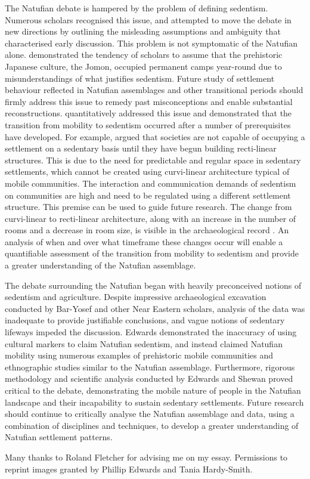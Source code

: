 \documentclass[%
	]{ijsra}
\begin{document}
The Natufian debate is hampered by the problem of defining sedentism. Numerous scholars recognised this issue, and attempted to move the debate in new directions by outlining the misleading assumptions and ambiguity that characterised early discussion. This problem is not symptomatic of the Natufian alone. 
\textcite{Habu_1996} demonstrated the tendency of scholars to assume that the prehistoric Japanese culture, the Jomon, occupied permanent camps year-round due to misunderstandings of what justifies sedentism. Future study of settlement behaviour reflected in Natufian assemblages and other transitional periods should firmly address this issue to remedy past misconceptions and enable substantial reconstructions. 
\textcite{Fletcher_2007} quantitatively addressed this issue and demonstrated that the transition from mobility to sedentism occurred after a number of prerequisites have developed. 
For example, \textcite{Fletcher_2007} argued that societies are not capable of occupying a settlement on a sedentary basis until they have begun building recti-linear structures. This is due to the need for predictable and regular space in sedentary settlements, which cannot be created using curvi-linear architecture typical of mobile communities. The interaction and communication demands of sedentism on communities are high and need to be regulated using a different settlement structure. This premise can be used to guide future research. 
The change from curvi-linear to recti-linear architecture, along with an increase in the number of rooms and a decrease in room size, is visible in the archaeological record \parencite{Byrd_2005}. An analysis of when and over what timeframe these changes occur will enable a quantifiable assessment of the transition from mobility to sedentism and provide a greater understanding of the Natufian assemblage.

The debate surrounding the Natufian began with heavily preconceived notions of sedentism and agriculture. Despite impressive archaeological excavation conducted by Bar-Yosef and other Near Eastern scholars, analysis of the data was inadequate to provide justifiable conclusions, and vague notions of sedentary lifeways impeded the discussion. Edwards demonstrated the inaccuracy of using cultural markers to claim Natufian sedentism, and instead claimed Natufian mobility using numerous examples of prehistoric mobile communities and ethnographic studies similar to the Natufian assemblage. Furthermore, rigorous methodology and scientific analysis conducted by Edwards and Shewan proved critical to the debate, demonstrating the mobile nature of people in the Natufian landscape and their incapability to sustain sedentary settlements. Future research should continue to critically analyse the Natufian assemblage and data, using a combination of disciplines and techniques, to develop a greater understanding of Natufian settlement patterns.



\IJSRAseparator

Many thanks to Roland Fletcher for advising me on my essay. 
Permissions to reprint images granted by Phillip Edwards and Tania Hardy-Smith.
\IJSRAclosing%
\end{document}
